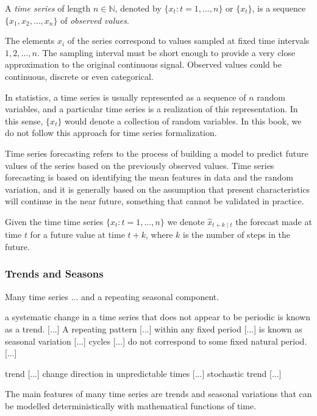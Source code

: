 \begin{definition}
A \emph{time series} of length $n \in \mathbb{N}$, denoted by $\{ x_t : t=1, \ldots, n \}$ or $\{ x_t \}$, is a sequence $\{ x_1, x_2, \ldots, x_n \}$ of \emph{observed values}.
\end{definition}

The elements $x_i$ of the series correspond to values sampled at fixed time intervals $1, 2, \ldots, n$. The sampling interval must be short enough to provide a very close approximation to the original continuous signal. Observed values could be continuous, discrete or even categorical.

In statistics, a time series is usually represented as a sequence of $n$ random variables, and a particular time series is a realization of this representation. In this sense, $\{ x_t \}$ would denote a collection of random variables. In this book, we do not follow this approach for time series formalization.

Time series forecasting refers to the process of building a model to predict future values of the series based on the previously observed values. Time series forecasting is based on identifying the mean features in data and the random variation, and it is generally based on the assumption that present characteristics will continue in the near future, something that cannot be validated in practice.

\begin{notation}
Given the time time series $\{ x_t : t=1, \ldots, n \}$ we denote $\hat{x}_{t+k \mid t}$ the forecast made at time $t$ for a future value at time $t+k$, where $k$ is the number of steps in the future.
\end{notation}

\subsubsection{Trends and Seasons}

Many time series ... and a repeating seasonal component.

{\color{red} a systematic change in a time series that does not appear to be periodic is known as a trend. [...] A repeating pattern [...] within any fixed period [...] is known as seasonal variation [...] cycles [...] do not correspond to some fixed natural period. [...]}

{\color{red} trend [...] change direction in unpredictable times [...] stochastic trend [...]}

{\color{red} The main features of many time series are trends and seasonal variations that can be modelled deterministically with mathematical functions of time.}

